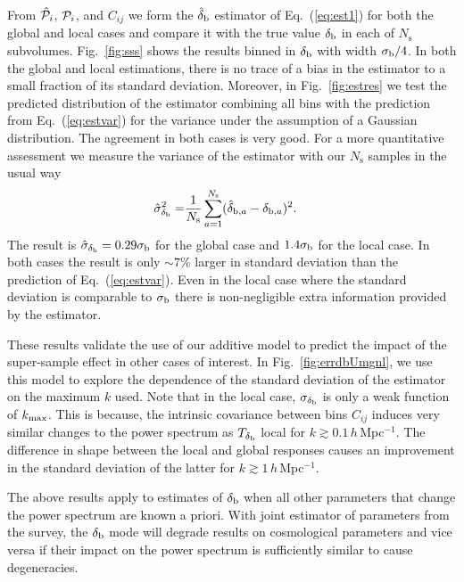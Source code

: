 \documentclass[prd,twocolumn,amsmath,amssymb,floatfix,superscriptaddress]{revtex4-1}
\newcommand{\br}{{\rm b}}
\newcommand{\hMpci}{$h\,$Mpc$^{-1}$}
\newcommand{\Dv}{{\cal P}}
\begin{document}
{From  $\hat\Dv_i$, $\Dv_i$, and $C_{ij}$ we form the $\hat\delta_\br$ estimator 
of Eq.~(\ref{eq:est1}) for both the global and local cases and compare it with the 
 true value $\delta_\br$ in each of $N_\textrm{s}$ subvolumes. 
Fig.~\ref{fig:sss} shows the results binned in $\delta_\br$ with width $\sigma_\br/4$.
In both the global and local estimations, there is no trace of a bias in the estimator
to a small fraction of its standard deviation.  Moreover, in Fig.~\ref{fig:estres} we test 
the predicted distribution of the estimator combining all bins with the prediction from
Eq.~(\ref{eq:estvar}) for the variance under the assumption of a Gaussian distribution.   
The agreement in both cases is very good.   For a more quantitative assessment
we measure the variance of the estimator with our $N_\textrm{s}$ samples in the usual
way
\begin{align}
\hat \sigma^2_{\delta_\br} = &   \frac{1}{N_\textrm{s}} \sum_{a=1}^{N_\textrm{s}} (\hat\delta_{\br,a} -\delta_{\br,a})^2.
\end{align}
The result is $\hat\sigma_{\delta_\br}=0.29\sigma_\br$ for the global case 
and $1.4\sigma_\br$ for the local case.  In both cases the result is only $\sim 7\%$
larger in standard deviation than 
the prediction of Eq.~(\ref{eq:estvar}).  Even in the local case
where the standard deviation is comparable to $\sigma_\br$ there is non-negligible
extra information provided by the estimator.


  
These results validate the use of our additive model to predict the impact of
the super-sample effect in other cases of interest.
In Fig.~\ref{fig:errdbUmgnl}, we use this model to explore the dependence of the standard deviation of the
estimator on the maximum $k$ used.  Note that in the local case, $\sigma_{\delta_\br}$ is only a weak function of $k_{\rm max}$.   This is because, the intrinsic covariance
between bins $C_{ij}$ induces very similar changes to the power spectrum as 
$T_{\delta_\br}$ local for $k\gtrsim 0.1\,$\hMpci.    The difference in shape between
the local and global responses causes an improvement
in the standard deviation of the latter for $k\gtrsim 1\,$\hMpci.

The above results apply to estimates of $\delta_\br$ when all other parameters
that change the power spectrum are known a priori.   With joint estimator of parameters
from the survey, the $\delta_\br$ mode will degrade results on cosmological parameters
and vice versa if their impact on the power spectrum is sufficiently similar to 
cause degeneracies.  

}
\end{document}

